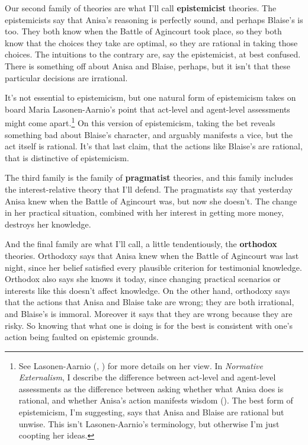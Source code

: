 \documentclass[
  10pt,
  letterpaper,
  twoside]{scrbook}
\begin{document}
Our second family of theories are what I'll call \textbf{epistemicist}
theories. The epistemicists say that Anisa's reasoning is perfectly
sound, and perhaps Blaise's is too. They both know when the Battle of
Agincourt took place, so they both know that the choices they take are
optimal, so they are rational in taking those choices. The intuitions to
the contrary are, say the epistemicist, at best confused. There is
something off about Anisa and Blaise, perhaps, but it isn't that these
particular decisions are irrational.

It's not essential to epistemicism, but one natural form of epistemicism
takes on board Maria Lasonen-Aarnio's point that act-level and
agent-level assessments might come apart.\footnote{See Lasonen-Aarnio
  (,
  ) for more details on her view.
  In \emph{Normative Externalism}, I describe the difference between
  act-level and agent-level assessments as the difference between asking
  whether what Anisa does is rational, and whether Anisa's action
  manifests wisdom (). The best form of epistemicism, I'm suggesting, says that
  Anisa and Blaise are rational but unwise. This isn't Lasonen-Aarnio's
  terminology, but otherwise I'm just coopting her ideas.} On this
version of epistemicism, taking the bet reveals something bad about
Blaise's character, and arguably manifests a vice, but the act itself is
rational. It's that last claim, that the actions like Blaise's are
rational, that is distinctive of epistemicism.

The third family is the family of \textbf{pragmatist} theories, and this
family includes the interest-relative theory that I'll defend. The
pragmatists say that yesterday Anisa knew when the Battle of Agincourt
was, but now she doesn't. The change in her practical situation,
combined with her interest in getting more money, destroys her
knowledge.

And the final family are what I'll call, a little tendentiously, the
\textbf{orthodox} theories. Orthodoxy says that Anisa knew when the
Battle of Agincourt was last night, since her belief satisfied every
plausible criterion for testimonial knowledge. Orthodox also says she
knows it today, since changing practical scenarios or interests like
this doesn't affect knowledge. On the other hand, orthodoxy says that
the actions that Anisa and Blaise take are wrong; they are both
irrational, and Blaise's is immoral. Moreover it says that they are
wrong because they are risky. So knowing that what one is doing is for
the best is consistent with one's action being faulted on epistemic
grounds.
\end{document}
